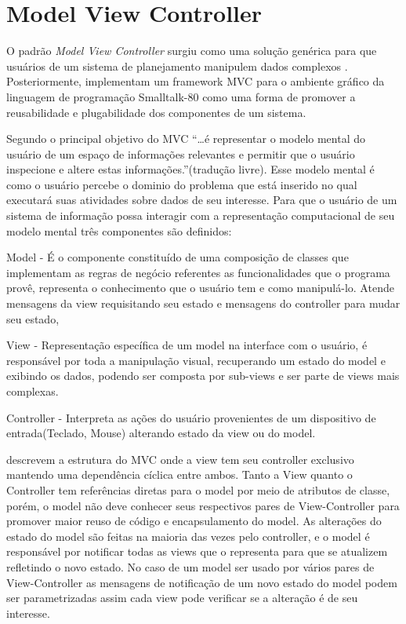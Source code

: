 \section{Model View Controller}

O padrão \textit{Model View Controller} surgiu como uma solução genérica para
que usuários de um sistema de planejamento manipulem dados complexos
. Posteriormente, 
implementam um framework MVC para o ambiente gráfico da linguagem de programação
Smalltalk-80 como uma forma de promover a reusabilidade e plugabilidade dos
componentes de um sistema.

Segundo  o principal objetivo do MVC
``\ldots é representar o modelo mental do usuário de um espaço de informações
relevantes e permitir que o usuário inspecione e altere estas
informações.''(tradução livre).
Esse modelo mental é como o usuário percebe o dominio do problema que está inserido no qual executará suas atividades sobre dados de seu interesse. Para que o usuário de um sistema de
informação possa interagir com a representação computacional  de seu modelo
mental três componentes são definidos:

Model - É o componente constituído de uma composição de classes que implementam
as regras de negócio referentes as funcionalidades que o programa provê,
representa o  conhecimento que o usuário tem e como manipulá-lo. Atende
mensagens da view requisitando seu estado e mensagens do controller para mudar
seu estado,

View - Representação específica de um model na interface com o usuário, é 
responsável por toda a manipulação visual, recuperando um estado do model e
exibindo os dados, podendo ser composta por sub-views e ser parte de views mais
complexas.

Controller - Interpreta as ações do usuário provenientes de um dispositivo de
entrada(Teclado, Mouse) alterando estado da view ou do model.




 descrevem a estrutura do MVC onde a view tem seu
controller exclusivo mantendo uma dependência cíclica entre ambos. Tanto a View
quanto o Controller tem referências diretas para o model por meio de atributos
de classe, porém, o model não deve conhecer seus respectivos pares de
View-Controller para promover maior reuso de código e encapsulamento do model.
As alterações do estado do model são feitas na maioria das vezes pelo controller, e
o model é responsável por notificar todas as views que o representa para que
se atualizem refletindo o novo estado. No caso de um model ser usado por vários
pares de View-Controller as mensagens de notificação de um novo estado do model
podem ser parametrizadas assim cada view pode verificar se a alteração é de seu
interesse. 

